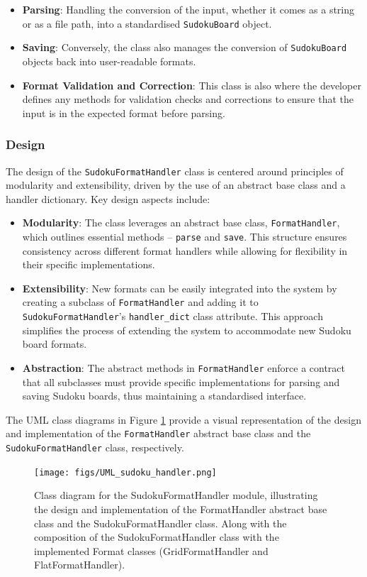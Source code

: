 \documentclass[11pt]{article}
\begin{document}
\begin{itemize}
\begin{itemize}
\item \textbf{Parsing}: Handling the conversion of the input, whether it comes as a string or as a file path, into a standardised \texttt{SudokuBoard} object.

\item \textbf{Saving}: Conversely, the class also manages the conversion of \texttt{SudokuBoard} objects back into user-readable formats. 

\item \textbf{Format Validation and Correction}: This class is also where the developer defines any methods for validation checks and corrections to ensure that the input is in the expected format before parsing.
\end{itemize}

\subsubsection{Design}
The design of the \texttt{SudokuFormatHandler} class is centered around principles of modularity and extensibility, driven by the use of an abstract base class and a handler dictionary. Key design aspects include:

\begin{itemize}
    \item \textbf{Modularity}: The class leverages an abstract base class, \texttt{FormatHandler}, which outlines essential methods -- \texttt{parse} and \texttt{save}. This structure ensures consistency across different format handlers while allowing for flexibility in their specific implementations.
    \item \textbf{Extensibility}: New formats can be easily integrated into the system by creating a subclass of \texttt{FormatHandler} and adding it to \texttt{SudokuFormatHandler}'s \texttt{handler\_dict} class attribute. This approach simplifies the process of extending the system to accommodate new Sudoku board formats.
    \item \textbf{Abstraction}: The abstract methods in \texttt{FormatHandler} enforce a contract that all subclasses must provide specific implementations for parsing and saving Sudoku boards, thus maintaining a standardised interface.
\end{itemize}
The UML class diagrams in Figure \ref{fig:format_handler_uml} provide a visual representation of the design and implementation of the \texttt{FormatHandler} abstract base class and the \texttt{SudokuFormatHandler} class, respectively.
\begin{figure}[H]
    \centering
    \texttt{[image: figs/UML\_sudoku\_handler.png]}
    \caption{Class diagram for the SudokuFormatHandler module, illustrating the design and implementation of the FormatHandler abstract base class and the SudokuFormatHandler class. Along with the composition of the SudokuFormatHandler class with the implemented Format classes (GridFormatHandler and FlatFormatHandler).}
    \label{fig:format_handler_uml}
\end{figure}


\end{itemize}
\end{document}
